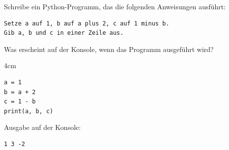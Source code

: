 \question[2]
Schreibe ein Python-Programm, das die folgenden Anweisungen ausführt:
\begin{lstlisting}[language={}]
Setze a auf 1, b auf a plus 2, c auf 1 minus b.
Gib a, b und c in einer Zeile aus.
\end{lstlisting}

Was erscheint auf der Konsole, wenn das Programm ausgeführt wird?
\begin{solutionbox}{4cm}
\begin{lstlisting}
a = 1
b = a + 2
c = 1 - b
print(a, b, c)
\end{lstlisting}
Ausgabe auf der Konsole:
\begin{lstlisting}
1 3 -2
\end{lstlisting}
\end{solutionbox}